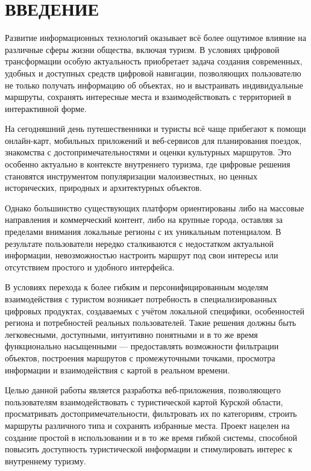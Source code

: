 \section*{ВВЕДЕНИЕ}

Развитие информационных технологий оказывает всё более ощутимое влияние на различные сферы жизни общества, включая туризм. В условиях цифровой трансформации особую актуальность приобретает задача создания современных, удобных и доступных средств цифровой навигации, позволяющих пользователю не только получать информацию об объектах, но и выстраивать индивидуальные маршруты, сохранять интересные места и взаимодействовать с территорией в интерактивной форме.

На сегодняшний день путешественники и туристы всё чаще прибегают к помощи онлайн-карт, мобильных приложений и веб-сервисов для планирования поездок, знакомства с достопримечательностями и оценки культурных маршрутов. Это особенно актуально в контексте внутреннего туризма, где цифровые решения становятся инструментом популяризации малоизвестных, но ценных исторических, природных и архитектурных объектов.

Однако большинство существующих платформ ориентированы либо на массовые направления и коммерческий контент, либо на крупные города, оставляя за пределами внимания локальные регионы с их уникальным потенциалом. В результате пользователи нередко сталкиваются с недостатком актуальной информации, невозможностью настроить маршрут под свои интересы или отсутствием простого и удобного интерфейса.

В условиях перехода к более гибким и персонифицированным моделям взаимодействия с туристом возникает потребность в специализированных цифровых продуктах, создаваемых с учётом локальной специфики, особенностей региона и потребностей реальных пользователей. Такие решения должны быть легковесными, доступными, интуитивно понятными и в то же время функционально насыщенными — предоставлять возможности фильтрации объектов, построения маршрутов с промежуточными точками, просмотра информации и взаимодействия с картой в реальном времени.

Целью данной работы является разработка веб-приложения, позволяющего пользователям взаимодействовать с туристической картой Курской области, просматривать достопримечательности, фильтровать их по категориям, строить маршруты различного типа и сохранять избранные места. Проект нацелен на создание простой в использовании и в то же время гибкой системы, способной повысить доступность туристической информации и стимулировать интерес к внутреннему туризму.

